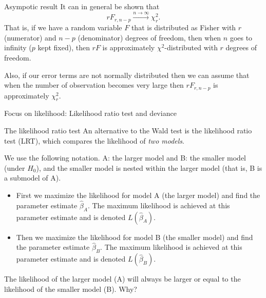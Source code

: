 \documentclass[
  ignorenonframetext,
]{beamer}
\providecommand{\tightlist}{%
  \setlength{\itemsep}{0pt}\setlength{\parskip}{0pt}}
\begin{document}
\begin{frame}{Asympotic result}
\label{asympotic-result}
It can in general be shown that
\[r F_{r,n-p}\stackrel{n\rightarrow \infty}{\longrightarrow} \chi^2_r.\]
That is, if we have a random variable \(F\) that is distributed as
Fisher with \(r\) (numerator) and \(n-p\) (denominator) degrees of
freedom, then when \(n\) goes to infinity (\(p\) kept fixed), then
\(rF\) is approximately \(\chi^2\)-distributed with \(r\) degrees of
freedom.

Also, if our error terms are not normally distributed then we can assume
that when the number of observation becomes very large then
\(rF_{r,n-p}\) is approximately \(\chi^2_r\).
\end{frame}

\begin{frame}{Focus on likelihood: Likelihood ratio test and deviance}
\label{focus-on-likelihood-likelihood-ratio-test-and-deviance}
\end{frame}

\begin{frame}{The likelihood ratio test}
\label{the-likelihood-ratio-test}
An alternative to the Wald test is the likelihood ratio test (LRT),
which compares the likelihood of \emph{two models}.

We use the following notation. A: the larger model and B: the smaller
model (under \(H_0\)), and the smaller model is nested within the larger
model (that is, B is a submodel of A).
\end{frame}

\begin{frame}{mm}
\label{mm}
\begin{itemize}
\tightlist
\item
  First we maximize the likelihood for model A (the larger model) and
  find the parameter estimate \(\hat{\beta}_A\). The maximum likelihood
  is achieved at this parameter estimate and is denoted
  \(L(\hat{\beta}_A)\).
\item
  Then we maximize the likelihood for model B (the smaller model) and
  find the parameter estimate \(\hat{\beta}_B\). The maximum likelihood
  is achieved at this parameter estimate and is denoted
  \(L(\hat{\beta}_B)\).
\end{itemize}

The likelihood of the larger model (A) will always be larger or equal to
the likelihood of the smaller model (B). Why?
\end{frame}
\end{document}
